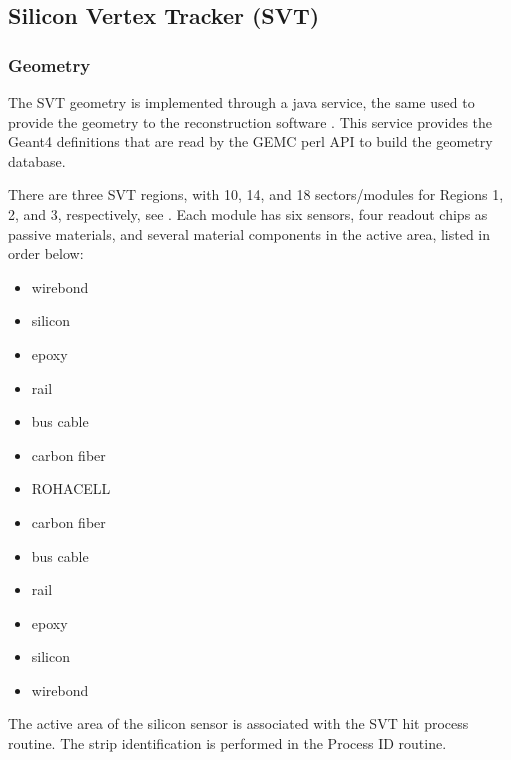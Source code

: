 \subsection{Silicon Vertex Tracker (SVT)}


\subsubsection{Geometry}


The SVT \cite{svt-nim} geometry is implemented through a java service, the same used to provide the geometry
to the reconstruction software \cite{recon-nim}.
This service provides the Geant4 definitions that are read by the GEMC perl API to build the geometry database.

There are three SVT regions, with 10, 14, and 18 sectors/modules for Regions 1, 2, and 3, respectively, see .
Each module has six sensors, four readout chips as passive materials, and several material components in the active area, listed in order below:

\begin{itemize}
	\item wirebond
	\item silicon
	\item epoxy
	\item rail
	\item bus cable
	\item carbon fiber
	\item ROHACELL
	\item carbon fiber
	\item bus cable
	\item rail
	\item epoxy
	\item silicon
	\item wirebond
\end{itemize}

The active area of the silicon sensor is associated with the SVT hit process routine.
The strip identification is performed in the Process ID routine.

